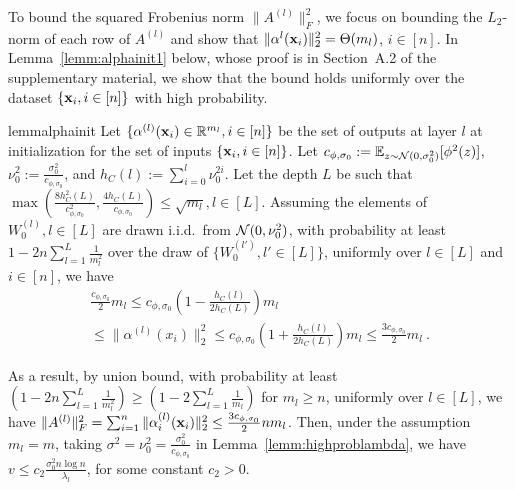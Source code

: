  To bound the squared Frobenius norm $\| A^{(l)} \|_F^2$, we focus on bounding the $L_2$-norm of each row of $A^{(l)}$ and show that $\|\alpha^l(\mathbf{x}_i)\|_2^2 = \Theta(m_l)$, $i\in[n]$. In Lemma~\ref{lemm:alphainit1} below, whose proof is in Section~A.2 of the supplementary material, we show that the bound holds uniformly over the dataset $\{\mathbf{x}_i, i\in [n]\}$ with high probability.
%
\begin{restatable}{lemm}{alphainit}
Let $\{\alpha^{(l)}(\mathbf{x}_i) \in \mathbb{R}^{m_l}, i \in [n]\}$ be the set of outputs at layer $l$ at initialization for the set of inputs $\{ \mathbf{x}_i, i \in [n]\}$. Let $c_{\phi, \sigma_0} := \mathbb{E}_{z \sim {\cal N}(0,\sigma_0^2)}[\phi^2(z)]$, $\nu_0^2 := \frac{\sigma_0^2}{c_{\phi,\sigma_0}}$, and $h_C(l) := \sum_{i=0}^l \nu_0^{2i}$. Let the depth $L$ be such that $\max\left(\frac{8h_C^2(L)}{c_{\phi,\sigma_0}^2} , \frac{4 h_C(L)}{c_{\phi,\sigma_0}} \right) \leq \sqrt{m_l}, l \in [L]$. Assuming the elements of $W_0^{(l)}, l \in [L]$ are drawn i.i.d.~from ${\cal N}(0,\nu_0^2)$, with probability at least $1 - 2n\sum^L_{l=1}\frac{1}{m_l^2}$ over the draw of $\{W^{(l')}_0, l'\in [L] \}$, uniformly over $l \in [L]$ and $i \in [n]$, we have 
\begin{multline*}
\frac{c_{\phi,\sigma_0}}{2} m_l \leq c_{\phi,\sigma_0}\left(1 -  \frac{h_C(l)}{2h_C(L)}\right) m_l \\ \leq  \| \alpha^{(l)}(x_i) \|_2^2 \leq c_{\phi,\sigma_0} \left(1 + \frac{h_C(l)}{2h_C(L)}\right) m_l \leq \frac{3 c_{\phi,\sigma_0}}{2} m_l~.
\end{multline*}
\label{lemm:alphainit1}
\end{restatable}
As a result, by union bound, with probability at least $(1 - 2n\sum_{l=1}^L\frac{1}{m_l^2}) \geq (1 - 2\sum_{l=1}^L\frac{1}{m_l})$ for $m_l \geq n$,
%
%
uniformly over $l \in [L]$, we have 
$\| A^{(l)} \|_F^2 = \sum_{i=1}^n \| \alpha_i^{(l)}(\mathbf{x}_i)\|_2^2 \leq \frac{3 c_{\phi,\sigma_0}}{2}n m_{l}$.
Then, under the assumption $m_l=m$, taking  $\sigma^2=\nu_0^2 = \frac{\sigma_0^2}{c_{\phi,\sigma_0}}$ in Lemma~\ref{lemm:highproblambda}, we have $v \leq c_2 \frac{\sigma_0^2 n \log n}{\lambda_l}$, for some constant $c_2>0$. 

